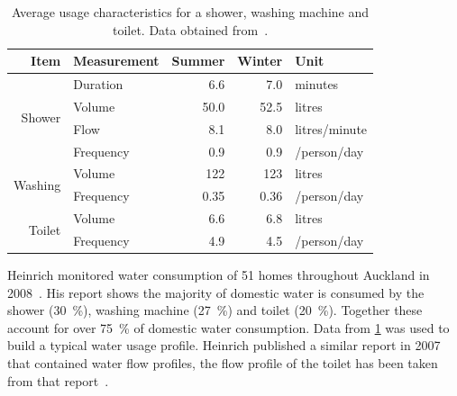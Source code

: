     \begin{table}
      \centering
      \begin{tabular}{r l|r|r|l}
        Item                    & Measurement & Summer & Winter & Unit\\
        \hline\hline
        \multirow{4}{*}{Shower} & Duration    & 6.6    & 7.0    & minutes\\
                                & Volume      & 50.0   & 52.5   & litres\\
                                & Flow        & 8.1    & 8.0    & litres/minute\\
                                & Frequency   & 0.9    & 0.9    & /person/day\\
        \hline
        \multirow{2}{*}{Washing}& Volume      & 122    & 123    & litres\\
                                & Frequency   & 0.35   & 0.36   & /person/day\\
        \hline
        \multirow{2}{*}{Toilet} & Volume      & 6.6    & 6.8    & litres\\
                                & Frequency   & 4.9    & 4.5    & /person/day\\
      \end{tabular}
      \caption{
          \label{tab:consumption_figures}
          Average usage characteristics for a shower, washing machine and toilet.
          Data obtained from~\cite{Heinrich2008}.
      }
    \end{table}

    Heinrich monitored water consumption of 51 homes throughout Auckland in 2008~\cite{Heinrich2008}.
    His report shows the majority of domestic water is consumed by the shower (\SI{30}{\percent}), washing machine (\SI{27}{\percent}) and toilet (\SI{20}{\percent}).
    Together these account for over \SI{75}{\percent} of domestic water consumption.
    Data from \cref{tab:consumption_figures} was used to build a typical water usage profile.
    Heinrich published a similar report in 2007 that contained water flow profiles, the flow profile of the toilet has been taken from that report~\cite{Heinrich2007}.
    
